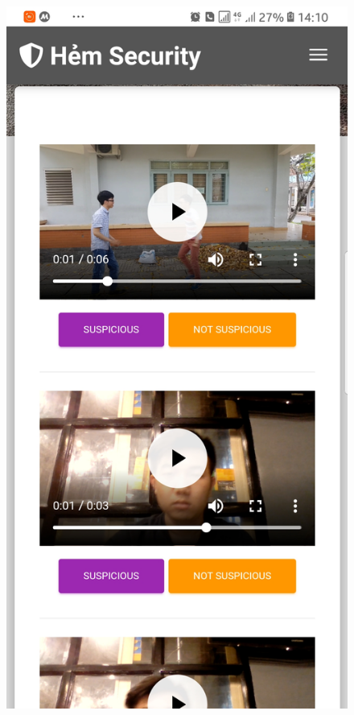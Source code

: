 \begin{figure}[!htb]
  \includegraphics[width=\linewidth]{images/chap4/label_mb.jpg}
\endminipage\hfill
{}

\end{figure}
